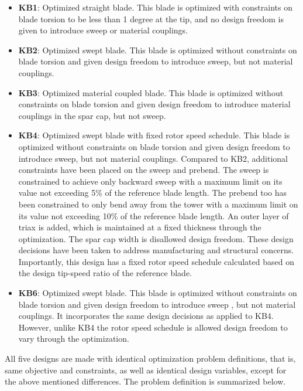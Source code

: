 \begin{itemize}
	\item \textbf{KB1}: Optimized straight blade. This blade is optimized with constraints on blade torsion to be less than 1 degree at the tip, and no design freedom is given to introduce sweep or material couplings.
	\item \textbf{KB2}: Optimized swept blade. This blade is optimized without constraints on blade torsion and given design freedom to introduce sweep, but not material couplings.
	\item \textbf{KB3}: Optimized material coupled blade. This blade is optimized without constraints on blade torsion and given design freedom to introduce material couplings in the spar cap, but not sweep.
	\item \textbf{KB4}: Optimized swept blade with fixed rotor speed schedule. This blade is optimized without constraints on blade torsion and given design freedom to introduce sweep, but not material couplings. Compared to KB2, additional constraints have been placed on the sweep and prebend. The sweep is constrained to achieve only backward sweep with a maximum limit on its value not exceeding 5\% of the reference blade length. The prebend too has been constrained to only bend away from the tower with a maximum limit on its value not exceeding 10\% of the reference blade length. An outer layer of triax is added, which is maintained at a fixed thickness through the optimization. The spar cap width is disallowed design freedom. These design decisions have been taken to address manufacturing and structural concerns. Importantly, this design has a fixed rotor speed schedule calculated based on the design tip-speed ratio of the reference blade. 
	\item \textbf{KB6}: Optimized swept blade. This blade is optimized without constraints on blade torsion and given design freedom to introduce sweep , but not material couplings. It incorporates the same design decisions as applied to KB4. However, unlike KB4 the rotor speed schedule is allowed design freedom to vary through the optimization. 
\end{itemize}

All five designs are made with identical optimization problem definitions, that is, same objective and constraints, as well as identical design variables, except for the above mentioned differences. The problem definition is summarized below.

